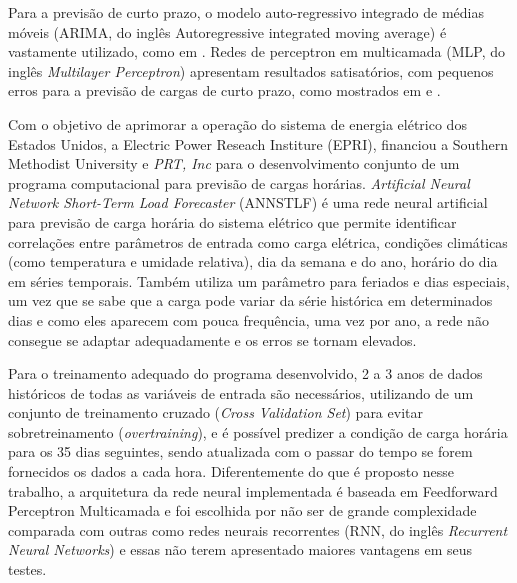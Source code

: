 \documentclass[
	12pt,				%
	oneside,			%
	a4paper,			%
	english,			%
	brazil				%
	]{abntex2}
\begin{document}
	Para a previsão de curto prazo, o modelo auto-regressivo integrado de médias móveis (ARIMA, do inglês Autoregressive integrated moving average) é vastamente utilizado, como em \cite{fan1994real}.	Redes de perceptron em multicamada (MLP, do inglês \textit{Multilayer Perceptron}) apresentam resultados satisatórios, com pequenos erros para a previsão de cargas de curto prazo, como mostrados em \cite{yalcinoz2005short} e \cite{ho1992short}.
	
	Com o objetivo de aprimorar a operação do sistema de energia elétrico dos Estados Unidos, a Electric Power Reseach Institure (EPRI), financiou a Southern Methodist University e \textit{PRT, Inc} para o desenvolvimento conjunto de um programa computacional para previsão de cargas horárias. \textit{Artificial Neural Network Short-Term Load Forecaster} (ANNSTLF) é uma rede neural artificial para previsão de carga horária do sistema elétrico que permite identificar correlações entre parâmetros de entrada como carga elétrica, condições climáticas (como temperatura e umidade relativa), dia da semana e do ano, horário do dia em séries temporais. Também utiliza um parâmetro para feriados e dias especiais, um vez que se sabe que a carga pode variar da série histórica em determinados dias e como eles aparecem com pouca frequência, uma vez por ano, a rede não consegue se adaptar adequadamente e os erros se tornam elevados. \cite{khotanzad1998annstlf}

	Para o treinamento adequado do programa desenvolvido, 2 a 3 anos de dados históricos de todas as variáveis de entrada são necessários, utilizando de um conjunto de treinamento cruzado (\textit{Cross Validation Set}) para evitar sobretreinamento (\textit{overtraining}), e é possível predizer a condição de carga horária para os 35 dias seguintes, sendo atualizada com o passar do tempo se forem fornecidos os dados a cada hora. Diferentemente do que é proposto nesse trabalho, a arquitetura da rede neural implementada é baseada em Feedforward Perceptron Multicamada e foi escolhida por não ser de grande complexidade comparada com outras como redes neurais recorrentes (RNN, do inglês \textit{Recurrent Neural Networks}) e essas não terem apresentado maiores vantagens em seus testes.


	
\end{document}

